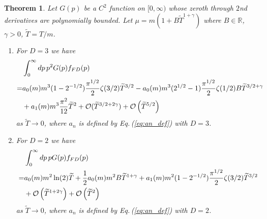 \documentclass[sn-mathphys,Numbered]{sn-jnl}
\newcommand{\req}[1]{Eq.\,(\ref{#1})}
\newtheorem{theorem}{Theorem}
\begin{document}
\begin{theorem}\label{thm:mu_zero_faster}
Let $G(p)$ be a $C^2$ function on $[0,\infty)$ whose zeroth through $2$nd derivatives are polynomially bounded. Let $\mu=m(1+B\widetilde{T}^{1+\gamma})$ where $B\in\mathbb{R}$, $\gamma>0$, $\widetilde{T}=T/m$. 
\begin{enumerate}
 \item For $D=3$ we have
\begin{align}
&\int_0^\infty dp\, p^{2} G(p) f_{FD}(p)\label{eq:FD_b_decay_orig_integral}\\
 =& a_0(m)m^{3}(1 - 2^{-1/2}) \frac{\pi^{1/2}}{2} \zeta(3/2)\widetilde{T}^{3/2}- a_0(m)m^{3}({2}^{1/2}-1)\frac{\pi^{1/2}}{2}\zeta(1/2)B\widetilde{T}^{3/2+\gamma}\label{eq:asymp_FD_int_b_decay}\\
 &+a_1(m)m^{3} \frac{\pi^2}{12}\widetilde{T}^{2}+\mathcal{O}(\widetilde{T}^{3/2+2\gamma})+\mathcal{O}\left(\widetilde{T}^{5/2}\right)\notag
\end{align}
as $\widetilde{T}\to 0$, where $a_n$ is defined by \req{eq:an_def} with $D=3$.
\item For $D=2$ we have
\begin{align}
&\int_0^\infty dp\, p G(p) f_{FD}(p)\\
 =& a_0(m)m^{2}\ln(2)\widetilde{T}+\frac{1}{2}a_0(m)m^{2}B\widetilde{T}^{1+\gamma}+a_1(m)m^{2}(1 - 2^{-1/2}) \frac{\pi^{1/2}}{2} \zeta(3/2)\widetilde{T}^{3/2}\label{eq:asymp_FD_int_b_decay_D2}\\
 &+\mathcal{O}\left(\widetilde{T}^{1+2\gamma}\right)+\mathcal{O}\left(\widetilde{T}^{2}\right)\notag
\end{align}
as $\widetilde{T}\to 0$, where $a_n$ is defined by \req{eq:an_def} with $D=2$.
\end{enumerate}

\end{theorem}
\end{document}
